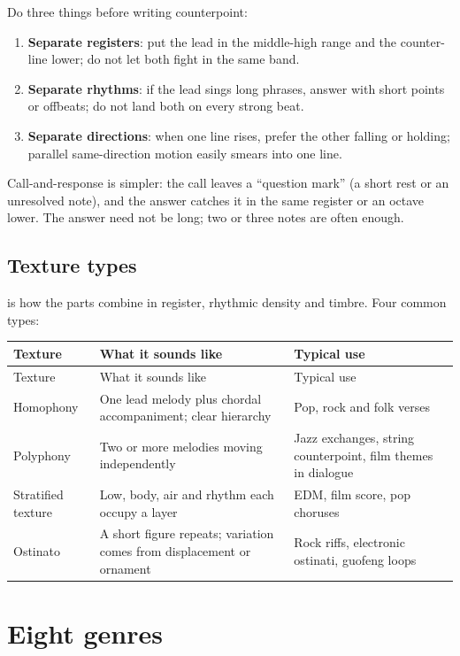 Do three things before writing counterpoint:

\begin{enumerate}
\item \textbf{Separate registers}: put the lead in the middle-high range and the counter-line lower; do not let both fight in the same band.
\item \textbf{Separate rhythms}: if the lead sings long phrases, answer with short points or offbeats; do not land both on every strong beat.
\item \textbf{Separate directions}: when one line rises, prefer the other falling or holding; parallel same-direction motion easily smears into one line.
\end{enumerate}

Call-and-response is simpler: the call leaves a ``question mark'' (a short rest or an unresolved note), and the answer catches it in the same register or an octave lower. The answer need not be long; two or three notes are often enough.

\subsection{Texture types}
\label{sec:texture-types}

 is how the parts combine in register, rhythmic density and timbre. Four common types:

\begin{longtable}{p{}p{}p{}}
\toprule
Texture & What it sounds like & Typical use \\
\midrule
\endfirsthead
\toprule
Texture & What it sounds like & Typical use \\
\midrule
\endhead
Homophony & One lead melody plus chordal accompaniment; clear hierarchy & Pop, rock and folk verses \\
Polyphony & Two or more melodies moving independently & Jazz exchanges, string counterpoint, film themes in dialogue \\
Stratified texture & Low, body, air and rhythm each occupy a layer & EDM, film score, pop choruses \\
Ostinato & A short figure repeats; variation comes from displacement or ornament & Rock riffs, electronic ostinati, guofeng loops \\
\bottomrule
\end{longtable}

\section{Eight genres}
\label{sec:genres-eight}

